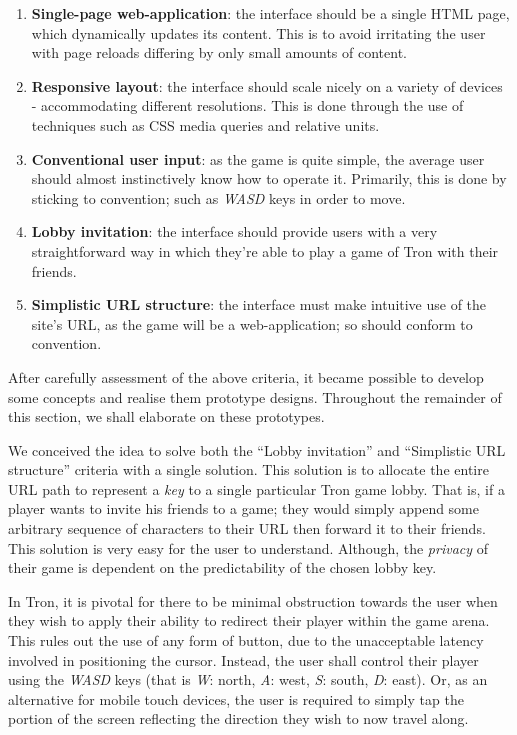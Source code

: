 \documentclass{standalone}
\begin{document}
		\begin{formal}
			\begin{enumerate}
				\item \textbf{Single-page web-application}: the interface should be a single HTML page, which dynamically updates its content. This is to avoid irritating the user with page reloads differing by only small amounts of content.
				\item \textbf{Responsive layout}: the interface should scale nicely on a variety of devices - accommodating different resolutions. This is done through the use of techniques such as CSS media queries and relative units.
				\item \textbf{Conventional user input}: as the game is quite simple, the average user should almost instinctively know how to operate it. Primarily, this is done by sticking to convention; such as \emph{WASD} keys in order to move.
				\item \textbf{Lobby invitation}: the interface should provide users with a very straightforward way in which they're able to play a game of Tron with their friends.
				\item \textbf{Simplistic URL structure}: the interface must make intuitive use of the site's URL, as the game will be a web-application; so should conform to convention.
			\end{enumerate}
		\end{formal}

		After carefully assessment of the above criteria, it became possible to develop some concepts and realise them prototype designs. Throughout the remainder of this section, we shall elaborate on these prototypes.

		We conceived the idea to solve both the \enquote{Lobby invitation} and \enquote{Simplistic URL structure} criteria with a single solution. This solution is to allocate the entire URL path to represent a \emph{key} to a single particular Tron game lobby. That is, if a player wants to invite his friends to a game; they would simply append some arbitrary sequence of characters to their URL then forward it to their friends. This solution is very easy for the user to understand. Although, the \emph{privacy} of their game is dependent on the predictability of the chosen lobby key.

		In Tron, it is pivotal for there to be minimal obstruction towards the user when they wish to apply their ability to redirect their player within the game arena. This rules out the use of any form of button, due to the unacceptable latency involved in positioning the cursor. Instead, the user shall control their player using the \emph{WASD} keys (that is \emph{W}: north, \emph{A}: west, \emph{S}: south, \emph{D}: east). Or, as an alternative for mobile touch devices, the user is required to simply tap the portion of the screen reflecting the direction they wish to now travel along.
\end{document}
